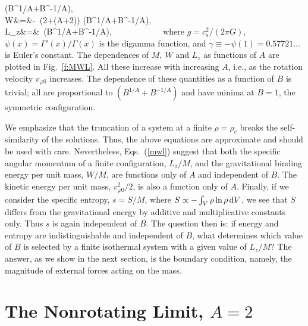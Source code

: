 \left(B^{1/A}+B^{-1/A}\right),\\
W&=&-\,
\Biggl(2+(A+2)\Biggr)
\left(B^{1/A}+B^{-1/A}\right), \\
L_z&=&\,
\left(B^{1/A}+B^{-1/A}\right),
~~~~~~~~~~~
\eea
\label{mwl}\noindent 
\eml
\noindent
where $g=c_s^2/(2\pi G)$,\  $\psi(x)=\Gamma'(x)/\Gamma(x)$ is the digamma 
function, and $\gamma\equiv-\psi(1)=0.57721\ldots$ is Euler's constant.
The dependences of $M, \ W$ and $L_z$ as functions of $A$ are plotted in 
Fig.\ \ref{f:MWL}. All these increase with increasing $A$, i.e., as the 
rotation velocity $v_{\varphi0}$ increases. The dependence of these quantities 
as a function of $B$ is trivial; all are proportional to 
$\left(B^{1/A}+B^{-1/A}\right)$ and have minima at $B=1$, 
the symmetric configuration.

We emphasize that the truncation of a system at a finite $\rho=\rho_c$ breaks 
the self-similarity of the solutions. Thus, the above equations are approximate
and should be used with care. Nevertheless, Eqs.\ (\ref{mwl}) suggest that
both the specific angular momentum of a finite configuration, $L_z/M$, and the
gravitational binding energy per unit mass, $W/M$, are functions only
of $A$ and independent of $B$. The kinetic energy per unit mass,
$v_{\varphi0}^2/2$, is also a function only of $A$. Finally, if we consider the
specific entropy, $s=S/M$, where $S\propto-\int_V\rho\ln\rho\,{\rm d}V$, we see
that $S$ differs from the gravitational energy by additive and multiplicative
constants only. Thus $s$ is again independent of $B$. The question then is: if
energy and entropy are indistinguishable and independent of $B$, what
determines which value of $B$ is selected by a finite isothermal system with a
given value of $L_z/M$? The answer, as we show in the next section, is the
boundary condition, namely, the magnitude of external forces acting on the mass.


\section{The Nonrotating Limit, $A=2$ \label{S:A=2} }

